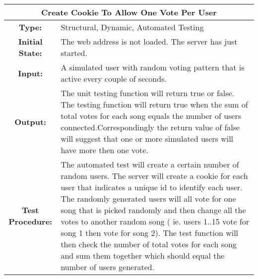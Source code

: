 \documentclass[12pt, titlepage]{article}
\begin{document}
\begin{center}
\begin{table}[H]
\begin{tabularx}{\textwidth}{| c X |}
\hline
\multicolumn{2}{|c|}{\textbf{Create Cookie To Allow One Vote Per User}}\\
\hline
\textbf{Type: } & Structural, Dynamic, Automated Testing\\

\textbf{Initial State: } & The web address is not loaded. The server has just started.\\

\textbf{Input: } & A simulated user with random voting pattern that is active every couple of seconds.\\

\textbf{Output: } & The unit testing function will return true or false. The testing function will return true when the sum of total votes for each song  equals the number of users connected.Correspondingly the return value of false will suggest that one or more simulated users will have more then one vote.\\

\textbf{Test Procedure:  } & The automated test will create a certain number of random users. The server will create a cookie for each user that indicates a unique id to identify each user. The randomly generated users will all vote for one song that is picked randomly and then change all the votes to another random song ( ie. users 1..15 vote for song 1 then vote for song 2). The test function will then check the number of total votes for each song and sum them together which should equal the number of users generated. \\
\hline
\end{tabularx}
\end{table}
\end{center}
\end{document}
